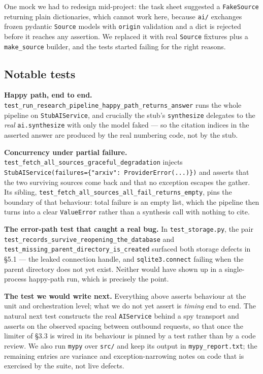 \documentclass[11pt,a4paper]{article}
\begin{document}
One mock we had to redesign mid-project: the task sheet suggested a \texttt{FakeSource} returning
plain dictionaries, which cannot work here, because \texttt{ai/} exchanges frozen pydantic
\texttt{Source} models with \texttt{origin} validation and a dict is rejected before it reaches
any assertion. We replaced it with real \texttt{Source} fixtures plus a \texttt{make\_source}
builder, and the tests started failing for the right reasons.

\subsection{Notable tests}

\textbf{Happy path, end to end.} \texttt{test\_run\_research\_pipeline\_happy\_path\_returns\_answer}
runs the whole pipeline on \texttt{StubAIService}, and crucially the stub's \texttt{synthesize}
delegates to the \emph{real} \texttt{ai.synthesize} with only the model faked --- so the
citation indices in the asserted answer are produced by the real numbering code, not by the stub.

\textbf{Concurrency under partial failure.}
\texttt{test\_fetch\_all\_sources\_graceful\_degradation} injects
\texttt{StubAIService(failures=\{"arxiv": ProviderError(...)\})} and asserts that the two
surviving sources come back and that no exception escapes the gather. Its sibling,
\texttt{test\_fetch\_all\_sources\_all\_fail\_returns\_empty}, pins the boundary of that
behaviour: total failure is an empty list, which the pipeline then turns into a clear
\texttt{ValueError} rather than a synthesis call with nothing to cite.

\textbf{The error-path test that caught a real bug.} In \texttt{test\_storage.py}, the pair
\texttt{test\_records\_survive\allowbreak\_reopening\_the\_database} and
\texttt{test\_missing\allowbreak\_parent\_directory\_is\_created} surfaced both storage defects
in \S5.1 --- the leaked connection handle, and \texttt{sqlite3.connect} failing when the parent
directory does not yet exist. Neither would have shown up in a single-process happy-path run,
which is precisely the point.

\textbf{The test we would write next.} Everything above asserts behaviour at the unit and
orchestration level; what we do not yet assert is \emph{timing} end to end. The natural next
test constructs the real \texttt{AIService} behind a spy transport and asserts on the observed
spacing between outbound requests, so that once the limiter of \S3.3 is wired in its behaviour is
pinned by a test rather than by a code review. We also run \texttt{mypy} over \texttt{src/} and keep its output in
\texttt{mypy\_report.txt}; the remaining entries are variance and exception-narrowing notes on
code that is exercised by the suite, not live defects.
\end{document}
